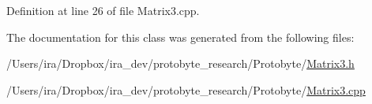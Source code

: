 Definition at line 26 of file Matrix3.\-cpp.



The documentation for this class was generated from the following files\-:\begin{DoxyCompactItemize}
\item 
/\-Users/ira/\-Dropbox/ira\-\_\-dev/protobyte\-\_\-research/\-Protobyte/\hyperlink{_matrix3_8h}{Matrix3.\-h}\item 
/\-Users/ira/\-Dropbox/ira\-\_\-dev/protobyte\-\_\-research/\-Protobyte/\hyperlink{_matrix3_8cpp}{Matrix3.\-cpp}\end{DoxyCompactItemize}
